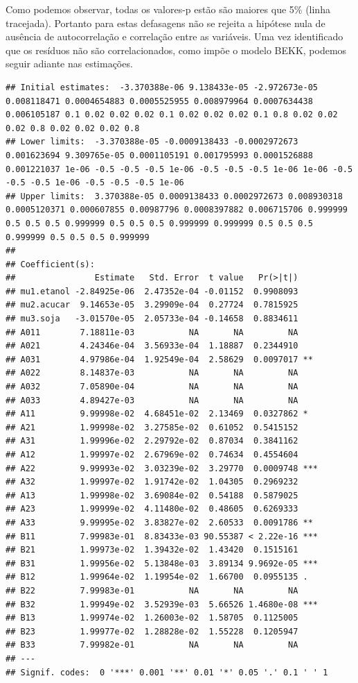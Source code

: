 Como podemos observar, todas os valores-p estão são maiores que 5\%
(linha tracejada). Portanto para estas defasagens não se rejeita a
hipótese nula de ausência de autocorrelação e correlação entre as
variáveis. Uma vez identificado que os resíduos não são correlacionados,
como impõe o modelo BEKK, podemos seguir adiante nas estimações.

\begin{verbatim}
## Initial estimates:  -3.370388e-06 9.138433e-05 -2.972673e-05 0.008118471 0.0004654883 0.0005525955 0.008979964 0.0007634438 0.006105187 0.1 0.02 0.02 0.02 0.1 0.02 0.02 0.02 0.1 0.8 0.02 0.02 0.02 0.8 0.02 0.02 0.02 0.8 
## Lower limits:  -3.370388e-05 -0.0009138433 -0.0002972673 0.001623694 9.309765e-05 0.0001105191 0.001795993 0.0001526888 0.001221037 1e-06 -0.5 -0.5 -0.5 1e-06 -0.5 -0.5 -0.5 1e-06 1e-06 -0.5 -0.5 -0.5 1e-06 -0.5 -0.5 -0.5 1e-06 
## Upper limits:  3.370388e-05 0.0009138433 0.0002972673 0.008930318 0.0005120371 0.000607855 0.00987796 0.0008397882 0.006715706 0.999999 0.5 0.5 0.5 0.999999 0.5 0.5 0.5 0.999999 0.999999 0.5 0.5 0.5 0.999999 0.5 0.5 0.5 0.999999 
## 
## Coefficient(s):
##                Estimate   Std. Error  t value   Pr(>|t|)    
## mu1.etanol -2.84925e-06  2.47352e-04 -0.01152  0.9908093    
## mu2.acucar  9.14653e-05  3.29909e-04  0.27724  0.7815925    
## mu3.soja   -3.01570e-05  2.05733e-04 -0.14658  0.8834611    
## A011        7.18811e-03           NA       NA         NA    
## A021        4.24346e-04  3.56933e-04  1.18887  0.2344910    
## A031        4.97986e-04  1.92549e-04  2.58629  0.0097017 ** 
## A022        8.14837e-03           NA       NA         NA    
## A032        7.05890e-04           NA       NA         NA    
## A033        4.89427e-03           NA       NA         NA    
## A11         9.99998e-02  4.68451e-02  2.13469  0.0327862 *  
## A21         1.99998e-02  3.27585e-02  0.61052  0.5415152    
## A31         1.99996e-02  2.29792e-02  0.87034  0.3841162    
## A12         1.99997e-02  2.67969e-02  0.74634  0.4554604    
## A22         9.99993e-02  3.03239e-02  3.29770  0.0009748 ***
## A32         1.99997e-02  1.91742e-02  1.04305  0.2969232    
## A13         1.99998e-02  3.69084e-02  0.54188  0.5879025    
## A23         1.99999e-02  4.11480e-02  0.48605  0.6269333    
## A33         9.99995e-02  3.83827e-02  2.60533  0.0091786 ** 
## B11         7.99983e-01  8.83433e-03 90.55387 < 2.22e-16 ***
## B21         1.99973e-02  1.39432e-02  1.43420  0.1515161    
## B31         1.99956e-02  5.13848e-03  3.89134 9.9692e-05 ***
## B12         1.99964e-02  1.19954e-02  1.66700  0.0955135 .  
## B22         7.99983e-01           NA       NA         NA    
## B32         1.99949e-02  3.52939e-03  5.66526 1.4680e-08 ***
## B13         1.99974e-02  1.26003e-02  1.58705  0.1125005    
## B23         1.99977e-02  1.28828e-02  1.55228  0.1205947    
## B33         7.99982e-01           NA       NA         NA    
## ---
## Signif. codes:  0 '***' 0.001 '**' 0.01 '*' 0.05 '.' 0.1 ' ' 1
\end{verbatim}

